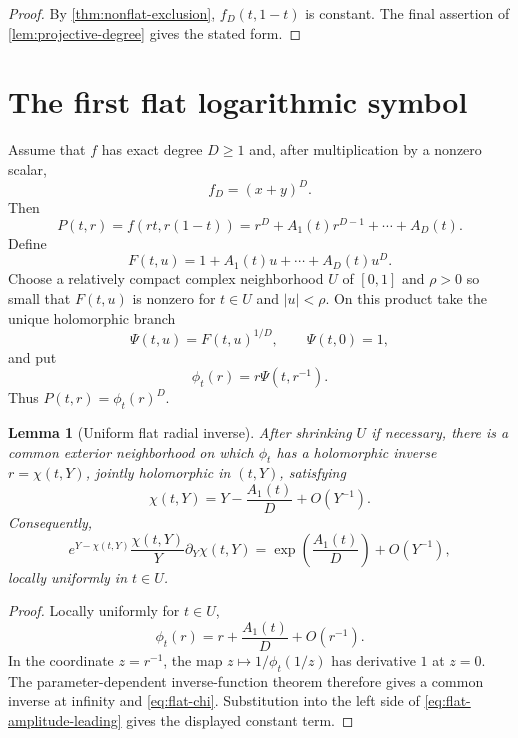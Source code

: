 \documentclass[11pt]{article}
\numberwithin{equation}{section}
\newtheorem{lemma}[lemma]{Lemma}
\theoremstyle{definition}
\theoremstyle{remark}
\begin{document}
\begin{proof}
By \cref{thm:nonflat-exclusion}, $f_D(t,1-t)$ is constant.  The final
assertion of \cref{lem:projective-degree} gives the stated form.
\end{proof}


\section{The first flat logarithmic symbol}\label{sec:flat-symbol}

Assume that $f$ has exact degree $D\ge1$ and, after multiplication by a
nonzero scalar,
\begin{equation}\label{eq:flat-normalized}
  f_D=(x+y)^D.
\end{equation}
Then
\begin{equation}\label{eq:flat-P}
  P(t,r)=f(rt,r(1-t))
  =r^D+A_1(t)r^{D-1}+\cdots+A_D(t).
\end{equation}
Define
\[
  F(t,u)=1+A_1(t)u+\cdots+A_D(t)u^D.
\]
Choose a relatively compact complex neighborhood $U$ of $[0,1]$ and
$\rho>0$ so small that $F(t,u)$ is nonzero for $t\in U$ and $|u|<\rho$.
On this product take the unique holomorphic branch
\[
  \Psi(t,u)=F(t,u)^{1/D},
  \qquad \Psi(t,0)=1,
\]
and put
\begin{equation}\label{eq:flat-phi}
  \phi_t(r)=r\Psi(t,r^{-1}).
\end{equation}
Thus $P(t,r)=\phi_t(r)^D$.

\begin{lemma}[Uniform flat radial inverse]\label{lem:flat-inverse}
After shrinking $U$ if necessary, there is a common exterior neighborhood
on which $\phi_t$ has a holomorphic inverse $r=\chi(t,Y)$, jointly
holomorphic in $(t,Y)$, satisfying
\begin{equation}\label{eq:flat-chi}
  \chi(t,Y)=Y-\frac{A_1(t)}D+O(Y^{-1}).
\end{equation}
Consequently,
\begin{equation}\label{eq:flat-amplitude-leading}
  e^{Y-\chi(t,Y)}\frac{\chi(t,Y)}Y\partial_Y\chi(t,Y)
  =\exp\!\left(\frac{A_1(t)}D\right)+O(Y^{-1}),
\end{equation}
locally uniformly in $t\in U$.
\end{lemma}

\begin{proof}
Locally uniformly for $t\in U$,
\[
  \phi_t(r)=r+\frac{A_1(t)}D+O(r^{-1}).
\]
In the coordinate $z=r^{-1}$, the map
$z\mapsto1/\phi_t(1/z)$ has derivative $1$ at $z=0$.  The
parameter-dependent inverse-function theorem therefore gives a common
inverse at infinity and \eqref{eq:flat-chi}.  Substitution into the left
side of \eqref{eq:flat-amplitude-leading} gives the displayed constant
term.
\end{proof}
\end{document}

